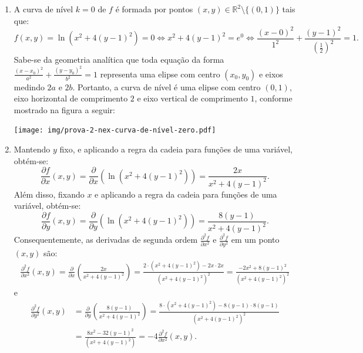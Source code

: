 \documentclass[12pt,a4paper]{article}
\begin{document}
\begin{ExerciseList}
\Answer
\begin{enumerate}
\item A curva de nível $k=0$ de $f$ é formada por pontos $(x, y) \in \mathbb{R}^2 \setminus\{(0, 1)\}$ tais que:
\[
    f(x, y) = \ln\left(x^2 + 4(y-1)^2\right) = 0
    \Leftrightarrow
    x^2 + 4(y-1)^2 = e^0
    \Leftrightarrow
    \frac{(x - 0)^2}{1^2} + \frac{(y-1)^2}{\left(\frac{1}{2}\right)^2} = 1.
\]
Sabe-se da geometria analítica que toda equação da forma $\frac{(x - x_0)^2}{a^2} + \frac{(y-y_0)^2}{b^2} = 1$ representa uma elipse com centro $(x_0, y_0)$ e eixos medindo $2a$ e $2b$. Portanto, a curva de nível é uma elipse com centro $(0, 1)$, eixo horizontal de comprimento $2$ e eixo vertical de comprimento $1$, conforme mostrado na figura a seguir:
\begin{center}
\texttt{[image: img/prova-2-nex-curva-de-nível-zero.pdf]}
\end{center}
\item Mantendo $y$ fixo, e aplicando a regra da cadeia para funções de uma variável, obtém-se:
\[
\frac{\partial f}{\partial x}(x, y)
= \frac{\partial}{\partial x}\left(\ln\left(x^2 + 4(y-1)^2\right)\right)
= \frac{2x}{x^2 + 4(y-1)^2}.
\]
Além disso, fixando $x$ e aplicando a regra da cadeia para funções de uma variável, obtém-se:
\[
\frac{\partial f}{\partial y}(x, y)
= \frac{\partial}{\partial y}\left(\ln\left(x^2 + 4(y-1)^2\right)\right)
=\frac{8(y-1)}{x^2 + 4(y-1)^2}.
\]
Consequentemente, as derivadas de segunda ordem $\frac{\partial^2 f}{\partial x^2}$ e $\frac{\partial^2 f}{\partial y^2}$ em um ponto $(x,y)$ são:
\begin{align*}
\frac{\partial^2 f}{\partial x^2}(x, y)
  = \frac{\partial}{\partial x}\left(\frac{2x}{x^2 + 4(y-1)^2}\right)
  = \frac{2\cdot(x^2 + 4(y-1)^2) - 2x \cdot 2x}{\left(x^2 + 4(y-1)^2\right)^2}
  = \frac{-2 x^2 + 8(y-1)^2}{\left(x^2 + 4(y-1)^2\right)^2}
\end{align*}
e
\begin{align*}
\frac{\partial^2 f}{\partial y^2}(x, y)
  & = \frac{\partial}{\partial y}\left(\frac{8(y-1)}{x^2 + 4(y-1)^2}\right)
    = \frac{8\cdot(x^2 + 4(y-1)^2) - 8(y-1)\cdot 8(y-1)}{\left(x^2 + 4(y-1)^2\right)^2} \\
  & = \frac{8x^2 - 32(y-1)^2}{\left(x^2 + 4(y-1)^2\right)}
    = -4 \frac{\partial^2 f}{\partial x^2}(x, y).
\end{align*}
\end{enumerate}



\end{ExerciseList}
\end{document}
